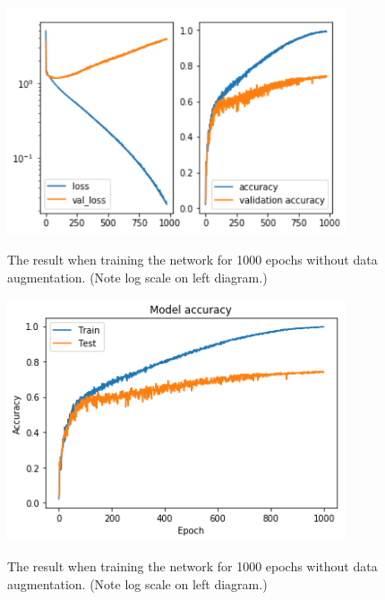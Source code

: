 \documentclass{kththesis}
\begin{document}
\begin{figure}
  \begin{center}
    \includegraphics[width=100mm]{img/overfitted.png}
    \label{fig:overfitted}
    \caption{The result when training the network for 1000 epochs without data augmentation. (Note log scale on left diagram.)}
  \end{center}
\end{figure}
\begin{figure}
  \begin{center}
    \includegraphics[width=100mm]{img/overfitted_acc.png}
    \label{fig:overfitted_acc}
    \caption{The result when training the network for 1000 epochs without data augmentation. (Note log scale on left diagram.)}
  \end{center}
\end{figure}
\end{document}
